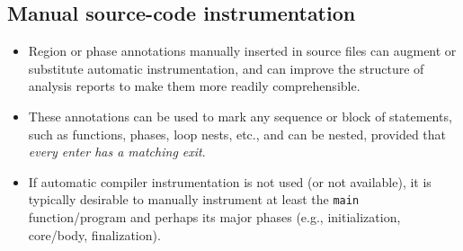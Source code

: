\documentclass[a4paper]{article}
\begin{document}
\clearpage



\subsection*{Manual source-code instrumentation}
\label{sec:manual_inst}

\begin{itemize}
  \item Region or phase annotations manually inserted in source files can augment or
substitute automatic instrumentation, and can improve the structure of analysis reports
to make them more readily comprehensible.
  \item These annotations can be used to mark any sequence
or block of statements, such as functions, phases, loop nests, etc., and can be
nested, provided that \emph{every enter has a matching exit}.
  \item If automatic compiler instrumentation is not used (or not
available), it is typically desirable to manually instrument at least
the \texttt{main} function/program and perhaps its major phases (e.g.,
initialization, core/body, finalization).
\end{itemize}
\end{document}
